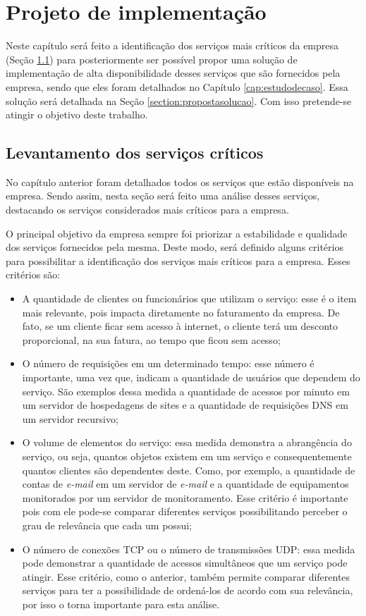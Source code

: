 \chapter{Projeto de implementação}
\label{cap:projetoimplementacao}

Neste capítulo será feito a identificação dos serviços mais críticos da empresa (Seção \ref{section:servcrit}) para posteriormente ser possível 
propor uma solução de implementação de alta disponibilidade desses serviços que são fornecidos pela empresa, sendo que eles foram detalhados no 
Capítulo \ref{cap:estudodecaso}. Essa solução será detalhada na Seção \ref{section:propostasolucao}. Com isso pretende-se atingir o objetivo 
deste trabalho.

\section{Levantamento dos serviços críticos}
\label{section:servcrit}

No capítulo anterior foram detalhados todos os serviços que estão disponíveis na empresa. Sendo assim, nesta seção será feito uma análise desses
serviços, destacando os serviços considerados mais críticos para a empresa. 

O principal objetivo da empresa sempre foi priorizar a estabilidade e qualidade dos serviços fornecidos pela mesma. Deste modo, será definido 
alguns critérios para possibilitar a identificação dos serviços mais críticos para a empresa. Esses critérios são:
\begin{itemize}
 \item A quantidade de clientes ou funcionários que utilizam o serviço: esse é o item mais relevante, pois impacta diretamente no faturamento
 da empresa. De fato, se um cliente ficar sem acesso à internet, o cliente terá um desconto proporcional, na sua fatura, ao tempo que ficou sem 
 acesso; 
 \item O número de requisições em um determinado tempo: esse número é importante, uma vez que, indicam a quantidade de usuários que dependem do 
 serviço. São exemplos dessa medida a quantidade de acessos por minuto em um servidor de hospedagens de sites e a quantidade de requisições 
 \ac{DNS} em um servidor recursivo;
 \item O volume de elementos do serviço: essa medida demonstra a abrangência do serviço, ou seja, quantos objetos existem em um serviço e 
 consequentemente quantos clientes são dependentes deste. Como, por exemplo, a quantidade de contas de \textit{e-mail} em um servidor de 
 \textit{e-mail} e a quantidade de equipamentos monitorados por um servidor de monitoramento. Esse critério é importante pois com ele pode-se
 comparar diferentes serviços possibilitando perceber o grau de relevância que cada um possui;
 \item O número de conexões \ac{TCP} ou o número de transmissões \ac{UDP}: essa medida pode demonstrar a quantidade de acessos simultâneos que um
 serviço pode atingir. Esse critério, como o anterior, também permite comparar diferentes serviços para ter a possibilidade de ordená-los de acordo 
 com sua relevância, por isso o torna importante para esta análise.
\end{itemize}

